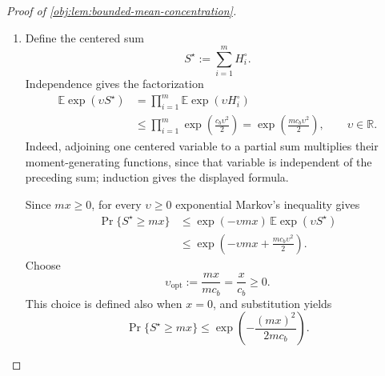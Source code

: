 \begin{proof}[Proof of \cref{obj:lem:bounded-mean-concentration}]
\begin{enumerate}
The interval bound persists under the tilt. Consequently,
\[
\begin{aligned}
0
&\le
\mathbb E_{\upsilon}^{(i)}
\bigl[(u_i^\circ-H_i^\circ)(H_i^\circ-\ell_i^\circ)\bigr]\\
&=
-\mathbb E_{\upsilon}^{(i)}[(H_i^\circ)^2]
+(u_i^\circ+\ell_i^\circ)\bar h_{i,\upsilon}
-u_i^\circ\ell_i^\circ.
\end{aligned}
\]
Subtracting the squared tilted mean yields
\[
\begin{aligned}
\psi_i''(\upsilon)
&\le
(u_i^\circ-\bar h_{i,\upsilon})
(\bar h_{i,\upsilon}-\ell_i^\circ)\\
&=
\left(\frac{u_i^\circ-\ell_i^\circ}{2}\right)^2
-
\left(\bar h_{i,\upsilon}
-\frac{u_i^\circ+\ell_i^\circ}{2}\right)^2
\le c_b.
\end{aligned}
\]
For \(\upsilon>0\), Taylor's theorem supplies an intermediate point
\[
\upsilon_{i,\mathrm{mid}}\in(0,\upsilon),
\qquad
\psi_i(\upsilon)
=
\frac{\upsilon^2}{2}\psi_i''(\upsilon_{i,\mathrm{mid}})
\le\frac{c_b\upsilon^2}{2}.
\]
Thus \(\Phi_i(\upsilon)\le\exp(c_b\upsilon^2/2)\) for positive \(\upsilon\); at zero both sides equal one. For negative \(\upsilon\), apply the same positive-parameter calculation to the centered variable \(-H_i^\circ\), whose interval has the same width:
\[
-u_i^\circ\le-H_i^\circ\le-\ell_i^\circ,
\qquad
\mathbb E[-H_i^\circ]=0.
\]
It follows that
\[
\Phi_i(\upsilon)
=
\mathbb E\exp\bigl((-\upsilon)(-H_i^\circ)\bigr)
\le
\exp\left(\frac{c_b(-\upsilon)^2}{2}\right).
\]
We have therefore established
\[
\mathbb E\exp(\upsilon H_i^\circ)
\le\exp\left(\frac{c_b\upsilon^2}{2}\right),
\qquad \upsilon\in\mathbb R,\quad i=1,\ldots,m.
\]

\item
Define the centered sum
\[
S^\star:=\sum_{i=1}^m H_i^\circ.
\]
Independence gives the factorization
\[
\begin{aligned}
\mathbb E\exp(\upsilon S^\star)
&=\prod_{i=1}^m\mathbb E\exp(\upsilon H_i^\circ)\\
&\le
\prod_{i=1}^m\exp\left(\frac{c_b\upsilon^2}{2}\right)
=
\exp\left(\frac{mc_b\upsilon^2}{2}\right),
\qquad \upsilon\in\mathbb R.
\end{aligned}
\]
Indeed, adjoining one centered variable to a partial sum multiplies their moment-generating functions, since that variable is independent of the preceding sum; induction gives the displayed formula.

Since \(mx\ge0\), for every \(\upsilon\ge0\) exponential Markov's inequality gives
\[
\begin{aligned}
\Pr\{S^\star\ge mx\}
&\le
\exp(-\upsilon mx)\,\mathbb E\exp(\upsilon S^\star)\\
&\le
\exp\left(-\upsilon mx+\frac{mc_b\upsilon^2}{2}\right).
\end{aligned}
\]
Choose
\[
\upsilon_{\mathrm{opt}}:=\frac{mx}{mc_b}=\frac{x}{c_b}\ge0.
\]
This choice is defined also when \(x=0\), and substitution yields
\[
\Pr\{S^\star\ge mx\}
\le
\exp\left(-\frac{(mx)^2}{2mc_b}\right).
\]


\end{enumerate}
\end{proof}
